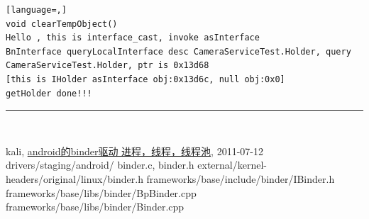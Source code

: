 \documentclass[a4paper,11pt]{article}
\begin{document}
\begin{appendices}
\begin{lstlisting}[language=,]
void clearTempObject()
Hello , this is interface_cast, invoke asInterface
BnInterface queryLocalInterface desc CameraServiceTest.Holder, query CameraServiceTest.Holder, ptr is 0x13d68
[this is IHolder asInterface obj:0x13d6c, null obj:0x0]
getHolder done!!!
\end{lstlisting}

\end{appendices}


\noindent\rule[-1ex]{\textwidth}{3pt}\\[2.0ex] 
\begin{thebibliography}{Binder}
     kali,
        \href{http://blog.sina.com.cn/s/blog_69f669470100s40o.html}{android的binder驱动 进程，线程，线程池},
        2011-07-12
    drivers/staging/android/ binder.c, binder.h
    external/kernel-headers/original/linux/binder.h
    frameworks/base/include/binder/IBinder.h
    frameworks/base/libs/binder/BpBinder.cpp
    frameworks/base/libs/binder/Binder.cpp
\end{thebibliography}
\printindex

\end{document}
